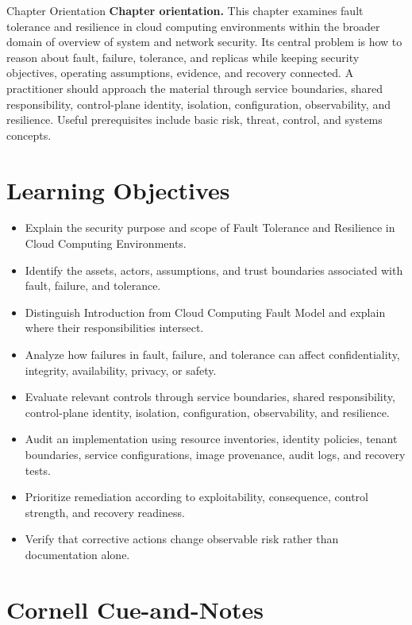 \documentclass[11pt,letterpaper]{article}
\title{\CornellDocumentTitle}
\author{}
\date{}
\begin{document}
\maketitle
\begin{CornellOverviewBox}{Chapter Orientation}
\textbf{Chapter orientation.} This chapter examines fault tolerance and resilience in cloud computing environments within the broader domain of overview of system and network security. Its central problem is how to reason about fault, failure, tolerance, and replicas while keeping security objectives, operating assumptions, evidence, and recovery connected. A practitioner should approach the material through service boundaries, shared responsibility, control-plane identity, isolation, configuration, observability, and resilience. Useful prerequisites include basic risk, threat, control, and systems concepts.
\end{CornellOverviewBox}
\section*{Learning Objectives}
\begin{itemize}
\item Explain the security purpose and scope of Fault Tolerance and Resilience in Cloud Computing Environments.
\item Identify the assets, actors, assumptions, and trust boundaries associated with fault, failure, and tolerance.
\item Distinguish Introduction from Cloud Computing Fault Model and explain where their responsibilities intersect.
\item Analyze how failures in fault, failure, and tolerance can affect confidentiality, integrity, availability, privacy, or safety.
\item Evaluate relevant controls through service boundaries, shared responsibility, control-plane identity, isolation, configuration, observability, and resilience.
\item Audit an implementation using resource inventories, identity policies, tenant boundaries, service configurations, image provenance, audit logs, and recovery tests.
\item Prioritize remediation according to exploitability, consequence, control strength, and recovery readiness.
\item Verify that corrective actions change observable risk rather than documentation alone.
\end{itemize}
\section*{Cornell Cue-and-Notes}
\end{document}
